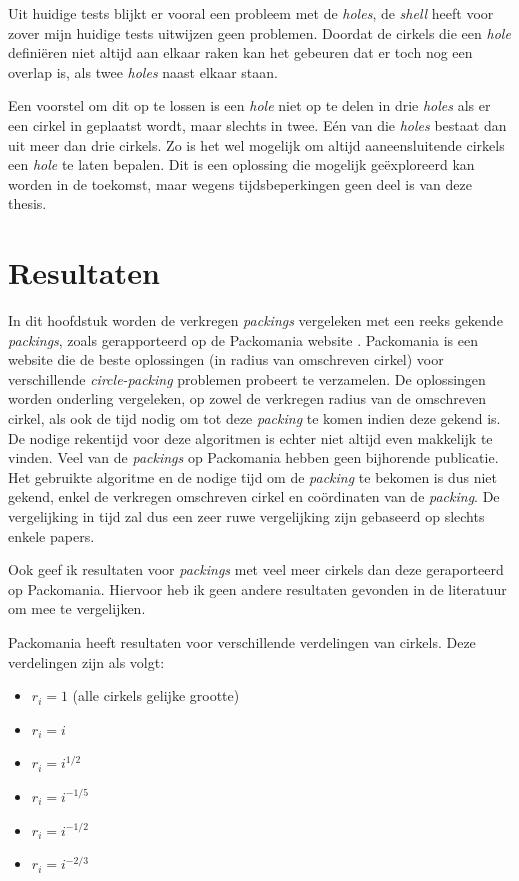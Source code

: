 \documentclass[12pt,a4paper,oneside]{book}
\begin{document}
Uit huidige tests blijkt er vooral een probleem met de \textit{holes}, de \textit{shell} heeft voor zover mijn huidige tests uitwijzen geen problemen.
Doordat de cirkels die een \textit{hole} definiëren niet altijd aan elkaar raken kan het gebeuren dat er toch nog een overlap is, als twee \textit{holes} naast elkaar staan.

Een voorstel om dit op te lossen is een \textit{hole} niet op te delen in drie \textit{holes} als er een cirkel in geplaatst wordt, maar slechts in twee.
Eén van die \textit{holes} bestaat dan uit meer dan drie cirkels.
Zo is het wel mogelijk om altijd aaneensluitende cirkels een \textit{hole} te laten bepalen.
Dit is een oplossing die mogelijk geëxploreerd kan worden in de toekomst, maar wegens tijdsbeperkingen geen deel is van deze thesis.

\chapter{Resultaten} \label{chap:resultaten}

In dit hoofdstuk worden de verkregen \textit{packings} vergeleken met een reeks gekende \textit{packings}, zoals gerapporteerd op de Packomania website \cite{packomania}.
Packomania is een website die de beste oplossingen (in radius van omschreven cirkel) voor verschillende \textit{circle-packing} problemen probeert te verzamelen.
De oplossingen worden onderling vergeleken, op zowel de verkregen radius van de omschreven cirkel, als ook de tijd nodig om tot deze \textit{packing} te komen indien deze gekend is.
De nodige rekentijd voor deze algoritmen is echter niet altijd even makkelijk te vinden.
Veel van de \textit{packings} op Packomania hebben geen bijhorende publicatie.
Het gebruikte algoritme en de nodige tijd om de \textit{packing} te bekomen is dus niet gekend, enkel de verkregen omschreven cirkel en coördinaten van de \textit{packing}.
De vergelijking in tijd zal dus een zeer ruwe vergelijking zijn gebaseerd op slechts enkele papers.

Ook geef ik resultaten voor \textit{packings} met veel meer cirkels dan deze geraporteerd op Packomania.
Hiervoor heb ik geen andere resultaten gevonden in de literatuur om mee te vergelijken.

Packomania heeft resultaten voor verschillende verdelingen van cirkels.
Deze verdelingen zijn als volgt:

\begin{itemize}
	\item $r_i=1$ (alle cirkels gelijke grootte)
	\item $r_i=i$
	\item $r_i=i^{1/2}$
	\item $r_i=i^{-1/5}$
	\item $r_i=i^{-1/2}$
	\item $r_i=i^{-2/3}$
\end{itemize}
\end{document}
